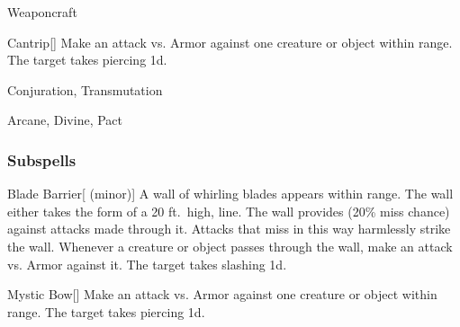 \newpage
\begin{spellsection}{Weaponcraft}

\begin{spellheader}
\end{spellheader}


\begin{ability}{Cantrip}[]
Make an attack vs. Armor against one creature or object within \rngmed range.
\hit The target takes piercing  \minus1d.
\end{ability}




 Conjuration, Transmutation

 Arcane, Divine, Pact
\end{spellsection}


\subsubsection{Subspells}


\begin{ability}[\nth{1}]{Blade Barrier}[ (minor)]
A wall of whirling blades appears within \rngmed range.
The wall either takes the form of a 20 ft.\ high, \arealarge line.
The wall provides  (20\% miss chance) against attacks made through it.
Attacks that miss in this way harmlessly strike the wall.
Whenever a creature or object passes through the wall, make an attack vs. Armor against it.
\hit The target takes slashing  \minus1d.
\end{ability}
\vspace{0.25em}


\begin{ability}[\nth{1}]{Mystic Bow}[]
Make an attack vs. Armor against one creature or object within \rngmed range.
\hit The target takes piercing  \plus1d.
\end{ability}
\vspace{0.25em}


